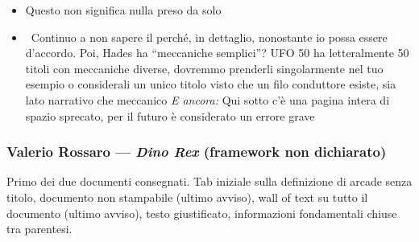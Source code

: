 {\begin{itemize}
  \item {} Questo non significa nulla preso da solo
  \item {} \rvAvviso\ Continuo a non sapere il perché, in dettaglio, nonostante io possa essere d'accordo. Poi, Hades ha ``meccaniche semplici''? UFO 50 ha letteralmente 50 titoli con meccaniche diverse, dovremmo prenderli singolarmente nel tuo esempio o considerali un unico titolo visto che un filo conduttore esiste, sia lato narrativo che meccanico \emph{E ancora:} Qui sotto c'è una pagina intera di spazio sprecato, per il futuro è considerato un errore grave
\end{itemize}
}

\subsubsection{Valerio Rossaro --- \emph{Dino Rex} (framework non
dichiarato)}
Primo dei due documenti consegnati. Tab iniziale sulla definizione di arcade
senza titolo, documento non stampabile (ultimo avviso), wall of text su tutto
il documento (ultimo avviso), testo giustificato, informazioni fondamentali
chiuse tra parentesi.
